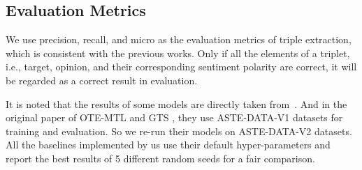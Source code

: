 \documentclass[11pt]{article}
\begin{document}
\begin{table*}[t]
    \centering
    \caption{Results of ablation study, and \textit{rm.} in this table means remove. The settings of all experiments are consistent with the main experiment. }
    \label{tab:analysis_results}
\end{table*} \subsection{Evaluation Metrics}
We use precision, recall, and micro  as the evaluation metrics of triple extraction, which is consistent with the previous works. Only if all the elements of a triplet, i.e., target, opinion, and their corresponding sentiment polarity are correct, it will be regarded as a correct result in evaluation.

It is noted that the results of some models are directly taken from~\cite{xu2020position}.
And in the original paper of OTE-MTL \cite{zhang2020multi} and GTS  \cite{wu-etal-2020-grid}, they use ASTE-DATA-V1 datasets for training and evaluation. So we re-run their models on ASTE-DATA-V2 datasets. All the baselines implemented by us use their default hyper-parameters and report the best results of 5 different random seeds for a fair comparison. 
\end{document}
